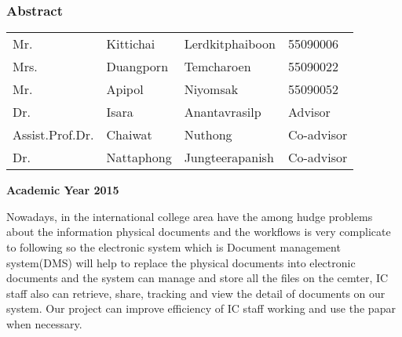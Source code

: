 \subsubsection{\huge{Abstract}}

\begin{flushright}
\begin{tabular}{llll}
	Mr. & Kittichai & Lerdkitphaiboon & 55090006 \\
	Mrs. & Duangporn & Temcharoen & 55090022 \\
	Mr. & Apipol & Niyomsak & 55090052 \\
	Dr. & Isara & Anantavrasilp & Advisor \\
	Assist.Prof.Dr. & Chaiwat & Nuthong & Co-advisor \\
	Dr. & Nattaphong & Jungteerapanish & Co-advisor \\
\end{tabular}

\textbf{Academic Year 2015}
\end{flushright}

Nowadays, in the international college area have the among hudge problems about the information physical documents and the workflows is very complicate to following so the electronic system which is Document management system(DMS) will help to replace the physical documents into electronic documents and the system can manage and store all the files on the cemter, IC staff also can retrieve, share, tracking and view the detail of documents on our system. 
Our project can improve efficiency of IC staff working and use the papar when necessary.
